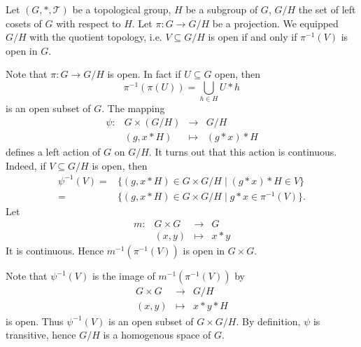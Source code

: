\begin{exampleenv}
    Let $(G,*,\mathscr{T})$ be a topological group,
    $H$ be a subgroup of $G$,
    $G/H$ the set of left cosets of $G$ with respect to $H$.
    Let $\pi : G \rightarrow G/H$ be a projection.
    We equipped $G/H$ with the quotient topology,
    i.e. $V \subseteq G/H$ is open if and only if $\pi^{-1} (V)$ is open in $G$.

    \quad Note that $\pi : G \rightarrow G/H$ is open.
    In fact if $U \subseteq G$ open, then
    $$ \pi^{-1} \left(\pi(U)\right) = \bigcup_{h \in H} U * h$$
    is an open subset of $G$.
    The mapping
    $$\begin{array}{rrcl}
        \psi : & G \times (G/H) & \longrightarrow & G/H\\
        & (g, x * H) & \longmapsto & (g * x) * H
    \end{array}$$
    defines a left action of $G$ on $G/H$.
    It turns out that this action is continuous.
    Indeed, if $V \subseteq G/H$ is open, then
    $$\begin{aligned}
        \psi^{-1} (V) = & \{(g, x * H) \in G \times G/H \mid (g * x) * H \in V\}\\
        = & \{(g, x * H) \in G \times G/H \mid g * x \in \pi^{-1} (V)\}.
    \end{aligned}$$
    Let
    $$\begin{array}{rrcl}
        m : & G \times G & \longrightarrow & G\\
        & (x,y) & \longmapsto & x * y
    \end{array}$$
    It is continuous.
    Hence $m^{-1} (\pi^{-1} (V))$ is open in $G \times G$.

    \quad Note that $\psi^{-1} (V)$ is the image of $m^{-1}(\pi^{-1} (V))$ by
    $$\begin{array}{rcl}
        G \times G & \longrightarrow & G/H\\
        (x,y) & \longmapsto & x * y * H
    \end{array}$$
    is open.
    Thus $\psi^{-1} (V)$ is an open subset of $G \times G/H$.
    By definition, $\psi$ is transitive, hence $G/H$ is a homogenous space of $G$.
\end{exampleenv}

